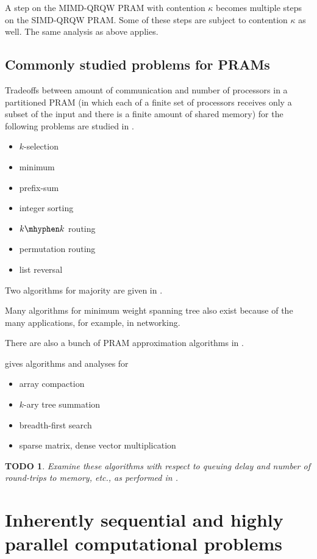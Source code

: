 \documentclass{article}
\newtheorem{todo}{TODO}
\begin{document}
A step on the MIMD-QRQW PRAM with contention $\kappa$ becomes multiple steps on the SIMD-QRQW PRAM.
Some of these steps are subject to contention $\kappa$ as well.
The same analysis as above applies.

\subsection{Commonly studied problems for PRAMs}

Tradeoffs between amount of communication and number of processors in a partitioned PRAM (in which each of a finite set of processors receives only a subset of the input and there is a finite amount of shared memory) for the following problems are studied in \cite{abn99}.
\begin{itemize}
\item $k$-selection
\item minimum
\item prefix-sum
\item integer sorting
\item $k\mhyphen k$ routing
\item permutation routing
\item list reversal
\end{itemize}

Two algorithms for majority are given in \cite{hc}.

Many algorithms for minimum weight spanning tree also exist because of the many applications, for example, in networking.

There are also a bunch of PRAM approximation algorithms in \cite{dsst97}.

\cite{vcl06} gives algorithms and analyses for
\begin{itemize}
\item array compaction
\item $k$-ary tree summation
\item breadth-first search
\item sparse matrix, dense vector multiplication
\end{itemize}

\begin{todo}
  Examine these algorithms with respect to queuing delay and number of round-trips to memory, etc., as performed in \cite{vcl06}.
\end{todo}

\section{Inherently sequential and highly parallel computational problems}
\end{document}
